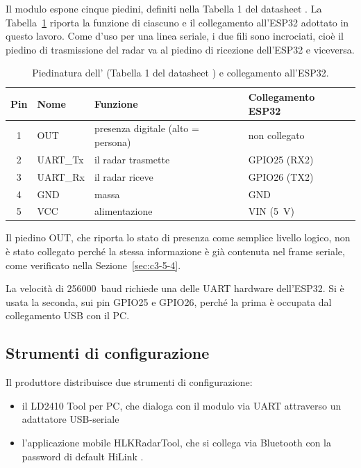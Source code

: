 Il modulo espone cinque piedini, definiti nella Tabella 1 del datasheet \cite{ld2410bDatasheet}. La Tabella~\ref{tab:c3-2} riporta la funzione di ciascuno e il collegamento all'ESP32 adottato in questo lavoro. Come d'uso per una linea seriale, i due fili sono incrociati, cioè il piedino di trasmissione del radar va al piedino di ricezione dell'ESP32 e viceversa.

\begin{table}[!htb]
\centering
\caption{Piedinatura dell'\ldb{} (Tabella 1 del datasheet \cite{ld2410bDatasheet}) e collegamento all'ESP32.}
\label{tab:c3-2}
\small
\begin{tabularx}{\linewidth}{@{}clXl@{}}
\toprule
\textbf{Pin} & \textbf{Nome} & \textbf{Funzione} & \textbf{Collegamento ESP32} \\
\midrule
1 & OUT & presenza digitale (alto = persona) & non collegato \\
2 & UART\_Tx & il radar trasmette & GPIO25 (RX2) \\
3 & UART\_Rx & il radar riceve & GPIO26 (TX2) \\
4 & GND & massa & GND \\
5 & VCC & alimentazione & VIN (5~V) \\
\bottomrule
\end{tabularx}
\end{table}

Il piedino OUT, che riporta lo stato di presenza come semplice livello logico, non è stato collegato perché la stessa informazione è già contenuta nel frame seriale, come verificato nella Sezione~\ref{sec:c3-5-4}.

La velocità di 256000~baud richiede una delle UART hardware dell'ESP32. Si è usata la seconda, sui pin GPIO25 e GPIO26, perché la prima è occupata dal collegamento USB con il PC.

\subsection{Strumenti di configurazione}
\label{sec:c3-1-3}

Il produttore distribuisce due strumenti di configurazione:

\begin{itemize}
  \item il LD2410 Tool per PC, che dialoga con il modulo via UART attraverso un adattatore USB-seriale \cite{hilinkDriveLD2410B}
  \item l'applicazione mobile HLKRadarTool, che si collega via Bluetooth con la password di default HiLink \cite{hilinkV244}.
\end{itemize}

